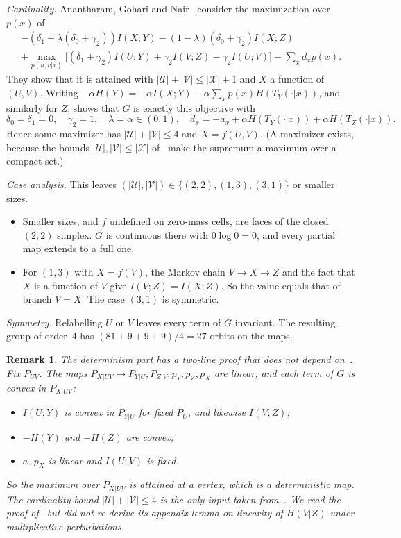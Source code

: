 \documentclass[11pt,draftclsnofoot,onecolumn,journal]{IEEEtran}
\newtheorem{remark}{Remark}
\newcommand{\ab}{\bar\alpha}
\begin{document}
\begin{IEEEproof}
\emph{Cardinality.} Anantharam, Gohari and Nair~\cite[Thm.~3]{AGN} consider the maximization over
$p(x)$ of
\begin{multline*}
-(\delta_1+\lambda(\delta_0+\gamma_2))I(X;Y)-(1-\lambda)(\delta_0+\gamma_2)I(X;Z)\\
+\max_{p(u,v|x)}\big[(\delta_1+\gamma_2)I(U;Y)+\gamma_2I(V;Z)-\gamma_2I(U;V)\big]-\textstyle\sum_xd_xp(x).
\end{multline*}
They show that it is attained with $|\mathcal U|+|\mathcal V|\le|\mathcal X|+1$ and $X$ a function of $(U,V)$.
Writing $-\alpha H(Y)=-\alpha I(X;Y)-\alpha\sum_xp(x)H(T_Y(\cdot|x))$, and similarly for $Z$, shows
that $G$ is exactly this objective with
\[
\delta_0=\delta_1=0,\quad \gamma_2=1,\quad \lambda=\alpha\in(0,1),\quad d_x=-a_x+\alpha H(T_Y(\cdot|x))+\ab H(T_Z(\cdot|x)).
\]
Hence some maximizer has $|\mathcal U|+|\mathcal V|\le4$ and $X=f(U,V)$. (A maximizer exists, because
the bounds $|\mathcal U|,|\mathcal V|\le|\mathcal X|$ of~\cite{GA} make the supremum a maximum over a compact set.)

\emph{Case analysis.} This leaves $(|\mathcal U|,|\mathcal V|)\in\{(2,2),(1,3),(3,1)\}$ or smaller sizes.
\begin{itemize}
\item Smaller sizes, and $f$ undefined on zero-mass cells, are faces of the closed $(2,2)$ simplex.
$G$ is continuous there with $0\log0=0$, and every partial map extends to a full one.
\item For $(1,3)$ with $X=f(V)$, the Markov chain $V\to X\to Z$ and the fact that $X$ is a function of $V$
give $I(V;Z)=I(X;Z)$. So the value equals that of branch $V=X$. The case $(3,1)$ is symmetric.
\end{itemize}

\emph{Symmetry.} Relabelling $U$ or $V$ leaves every term of $G$ invariant. The resulting group of
order~$4$ has $(81+9+9+9)/4=27$ orbits on the maps.
\end{IEEEproof}

\begin{remark}
The determinism part has a two-line proof that does not depend on~\cite{AGN}. Fix $P_{UV}$. The
maps $P_{X|UV}\mapsto P_{Y|U},P_{Z|V},p_Y,p_Z,p_X$ are linear, and each term of $G$ is convex in
$P_{X|UV}$:
\begin{itemize}
\item $I(U;Y)$ is convex in $P_{Y|U}$ for fixed $P_U$, and likewise $I(V;Z)$;
\item $-H(Y)$ and $-H(Z)$ are convex;
\item $a\cdot p_X$ is linear and $I(U;V)$ is fixed.
\end{itemize}
So the maximum over $P_{X|UV}$ is attained at a vertex, which is a deterministic map. The
cardinality bound $|\mathcal U|+|\mathcal V|\le4$ is the only input taken from~\cite{AGN}. We read the
proof of~\cite[Prop.~3, Lemma~1]{AGN} but did not re-derive its appendix lemma on linearity of
$H(V|Z)$ under multiplicative perturbations.
\end{remark}
\end{document}
